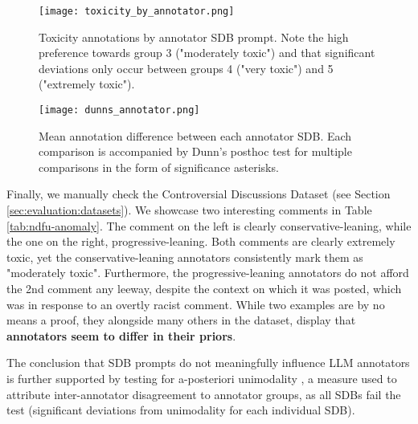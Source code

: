 \begin{figure}
	\centering
	\texttt{[image: toxicity\_by\_annotator.png]}
	\caption{Toxicity annotations by annotator SDB prompt. Note the high preference towards group 3 ("moderately toxic") and that significant deviations only occur between groups 4 ("very toxic") and 5 ("extremely toxic").}
	\label{fig::toxicity-annotator}
\end{figure}

\begin{figure}
	\centering
	\texttt{[image: dunns\_annotator.png]}
	\caption{Mean annotation difference between each annotator SDB. Each comparison is accompanied by Dunn's posthoc test for multiple comparisons in the form of significance asterisks.}
	\label{fig::toxicity-annotator-significance}
\end{figure}

Finally, we manually check the Controversial Discussions Dataset (see Section \ref{sec:evaluation:datasets}). We showcase two interesting comments in Table \ref{tab:ndfu-anomaly}. The comment on the left is clearly conservative-leaning, while the one on the right, progressive-leaning. Both comments are clearly extremely toxic, yet the conservative-leaning annotators consistently mark them as "moderately toxic". Furthermore, the progressive-leaning annotators do not afford the 2nd comment any leeway, despite the context on which it was posted, which was in response to an overtly racist comment. While two examples are by no means a proof, they alongside many others in the dataset, display that \textbf{annotators seem to differ in their priors}.

The conclusion that SDB prompts do not meaningfully influence LLM annotators is further supported by testing for a-posteriori unimodality \cite{pavlopoulos-likas-2024-polarized}, a measure used to attribute inter-annotator disagreement to annotator groups, as all SDBs fail the test (significant deviations from unimodality for each individual SDB).


